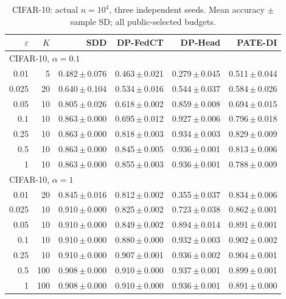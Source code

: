 \begin{table}[t]
\centering
\caption{CIFAR-10: actual $n=10^4$, three independent seeds. Mean accuracy $\pm$ sample SD; all public-selected budgets.}
\label{tab:new-cifar10}
\small\setlength{\tabcolsep}{3pt}
\begin{tabular}{@{}rrrrrr@{}}\toprule
$\varepsilon$ & $K$ & SDD & DP-FedCT & DP-Head & PATE-DI \\\midrule
\multicolumn{6}{l}{CIFAR-10, $\alpha=0.1$} \\
0.01 & 5 & 0.482\,$\pm$\,0.076 & 0.463\,$\pm$\,0.021 & 0.279\,$\pm$\,0.045 & 0.511\,$\pm$\,0.044 \\
0.025 & 20 & 0.640\,$\pm$\,0.104 & 0.534\,$\pm$\,0.016 & 0.544\,$\pm$\,0.037 & 0.584\,$\pm$\,0.026 \\
0.05 & 10 & 0.805\,$\pm$\,0.026 & 0.618\,$\pm$\,0.002 & 0.859\,$\pm$\,0.008 & 0.694\,$\pm$\,0.015 \\
0.1 & 10 & 0.863\,$\pm$\,0.000 & 0.695\,$\pm$\,0.012 & 0.927\,$\pm$\,0.006 & 0.796\,$\pm$\,0.018 \\
0.25 & 10 & 0.863\,$\pm$\,0.000 & 0.818\,$\pm$\,0.003 & 0.934\,$\pm$\,0.003 & 0.829\,$\pm$\,0.009 \\
0.5 & 10 & 0.863\,$\pm$\,0.000 & 0.845\,$\pm$\,0.005 & 0.936\,$\pm$\,0.001 & 0.813\,$\pm$\,0.006 \\
1 & 10 & 0.863\,$\pm$\,0.000 & 0.855\,$\pm$\,0.003 & 0.936\,$\pm$\,0.001 & 0.788\,$\pm$\,0.009 \\
\multicolumn{6}{l}{CIFAR-10, $\alpha=1$} \\
0.01 & 20 & 0.845\,$\pm$\,0.016 & 0.812\,$\pm$\,0.002 & 0.355\,$\pm$\,0.037 & 0.834\,$\pm$\,0.006 \\
0.025 & 10 & 0.910\,$\pm$\,0.000 & 0.825\,$\pm$\,0.002 & 0.723\,$\pm$\,0.038 & 0.862\,$\pm$\,0.001 \\
0.05 & 10 & 0.910\,$\pm$\,0.000 & 0.849\,$\pm$\,0.002 & 0.894\,$\pm$\,0.014 & 0.891\,$\pm$\,0.001 \\
0.1 & 10 & 0.910\,$\pm$\,0.000 & 0.880\,$\pm$\,0.000 & 0.932\,$\pm$\,0.003 & 0.902\,$\pm$\,0.002 \\
0.25 & 10 & 0.910\,$\pm$\,0.000 & 0.907\,$\pm$\,0.001 & 0.936\,$\pm$\,0.002 & 0.904\,$\pm$\,0.001 \\
0.5 & 100 & 0.908\,$\pm$\,0.000 & 0.910\,$\pm$\,0.000 & 0.937\,$\pm$\,0.001 & 0.899\,$\pm$\,0.001 \\
1 & 100 & 0.908\,$\pm$\,0.000 & 0.910\,$\pm$\,0.000 & 0.936\,$\pm$\,0.001 & 0.891\,$\pm$\,0.000 \\
\bottomrule\end{tabular}
\end{table}

